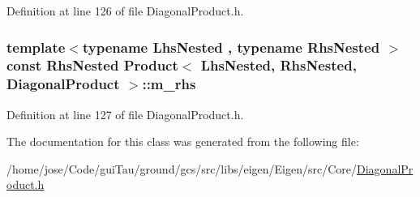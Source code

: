 Definition at line 126 of file Diagonal\-Product.\-h.

\hypertarget{class_product_3_01_lhs_nested_00_01_rhs_nested_00_01_diagonal_product_01_4_a9b0d6a899babe8127a059c7e5922f575}{
\subsubsection[{m\-\_\-rhs}]{\setlength{\rightskip}{0pt plus 5cm}template$<$typename Lhs\-Nested , typename Rhs\-Nested $>$ const Rhs\-Nested {\bf Product}$<$ Lhs\-Nested, Rhs\-Nested, {\bf Diagonal\-Product} $>$\-::m\-\_\-rhs\hspace{0.3cm}{\ttfamily [protected]}}}\label{class_product_3_01_lhs_nested_00_01_rhs_nested_00_01_diagonal_product_01_4_a9b0d6a899babe8127a059c7e5922f575}


Definition at line 127 of file Diagonal\-Product.\-h.



The documentation for this class was generated from the following file\-:\begin{DoxyCompactItemize}
\item 
/home/jose/\-Code/gui\-Tau/ground/gcs/src/libs/eigen/\-Eigen/src/\-Core/\hyperlink{_diagonal_product_8h}{Diagonal\-Product.\-h}\end{DoxyCompactItemize}

